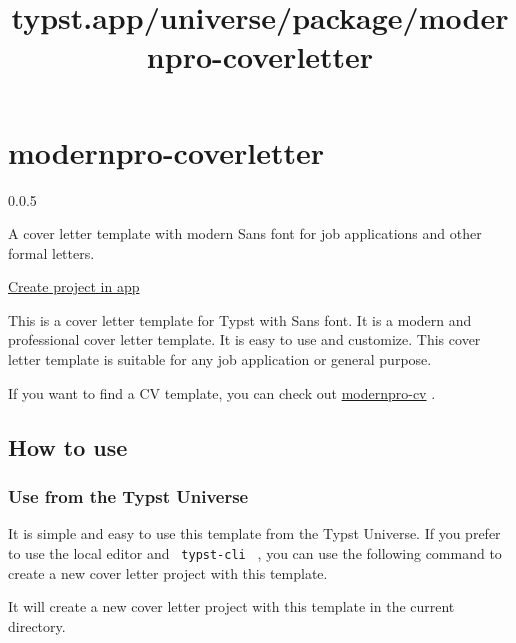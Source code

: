 \title{typst.app/universe/package/modernpro-coverletter}

\label{banner}
\label{template-thumbnail}

\section{modernpro-coverletter}\label{modernpro-coverletter}

{ 0.0.5 }

A cover letter template with modern Sans font for job applications and
other formal letters.

\href{/app?template=modernpro-coverletter&version=0.0.5}{Create project
in app}

\label{readme}
This is a cover letter template for Typst with Sans font. It is a modern
and professional cover letter template. It is easy to use and customize.
This cover letter template is suitable for any job application or
general purpose.

If you want to find a CV template, you can check out
\href{https://github.com/jxpeng98/Typst-CV-Resume/blob/main/README.md}{modernpro-cv}
.

\subsection{How to use}\label{how-to-use}

\subsubsection{Use from the Typst
Universe}\label{use-from-the-typst-universe}

It is simple and easy to use this template from the Typst Universe. If
you prefer to use the local editor and \texttt{\ typst-cli\ } , you can
use the following command to create a new cover letter project with this
template.

\begin{Shaded}
\begin{Highlighting}[]
\end{Highlighting}
\end{Shaded}

It will create a new cover letter project with this template in the
current directory.

